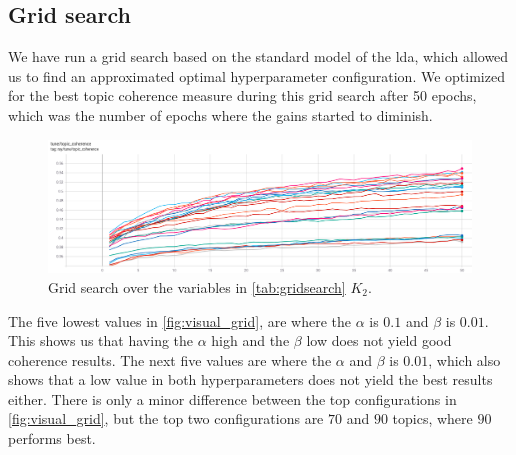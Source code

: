 \subsection{Grid search}
We have run a grid search based on the standard model of the \gls{lda}, which allowed us to find an approximated optimal hyperparameter configuration.
We optimized for the best topic coherence measure during this grid search after 50 epochs, which was the number of epochs where the gains started to diminish.
\begin{figure}
	\includegraphics[width=\textwidth]{figures/gridsearch.png}
	\caption{Grid search over the variables in \autoref{tab:gridsearch} $K_2$.}
	\label{fig:visual_grid}
\end{figure} 
The five lowest values in \autoref{fig:visual_grid}, are where the $\alpha$ is $0.1$ and $\beta$ is $0.01$. 
This shows us that having the $\alpha$ high and the $\beta$ low does not yield good coherence results.
The next five values are where the $\alpha$ and $\beta$ is $0.01$, which also shows that a low value in both hyperparameters does not yield the best results either.
There is only a minor difference between the top configurations in \autoref{fig:visual_grid}, but the top two configurations are $70$ and $90$ topics, where $90$ performs best.
